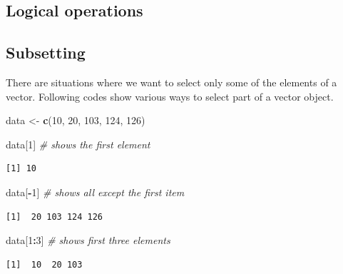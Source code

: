 \documentclass[
]{book}
\newenvironment{Shaded}{\begin{snugshade}}{\end{snugshade}}
\newcommand{\CommentTok}[1]{\textcolor[rgb]{0.56,0.35,0.01}{\textit{#1}}}
\newcommand{\DecValTok}[1]{\textcolor[rgb]{0.00,0.00,0.81}{#1}}
\newcommand{\KeywordTok}[1]{\textcolor[rgb]{0.13,0.29,0.53}{\textbf{#1}}}
\newcommand{\NormalTok}[1]{#1}
\newcommand{\OperatorTok}[1]{\textcolor[rgb]{0.81,0.36,0.00}{\textbf{#1}}}
\newcommand{\StringTok}[1]{\textcolor[rgb]{0.31,0.60,0.02}{#1}}
\begin{document}
\hypertarget{logical-operations}{%
\subsection{Logical operations}\label{logical-operations}}

\hypertarget{subsetting}{%
\subsection{Subsetting}\label{subsetting}}

There are situations where we want to select only some of the elements of a vector. Following codes show various ways to select part of a vector object.

\begin{Shaded}
\begin{Highlighting}[]
\NormalTok{data <-}\StringTok{ }\KeywordTok{c}\NormalTok{(}\DecValTok{10}\NormalTok{, }\DecValTok{20}\NormalTok{, }\DecValTok{103}\NormalTok{, }\DecValTok{124}\NormalTok{, }\DecValTok{126}\NormalTok{)}

\NormalTok{data[}\DecValTok{1}\NormalTok{] }\CommentTok{# shows the first element }
\end{Highlighting}
\end{Shaded}

\begin{verbatim}
[1] 10
\end{verbatim}

\begin{Shaded}
\begin{Highlighting}[]
\NormalTok{data[}\OperatorTok{-}\DecValTok{1}\NormalTok{] }\CommentTok{# shows all except the first item}
\end{Highlighting}
\end{Shaded}

\begin{verbatim}
[1]  20 103 124 126
\end{verbatim}

\begin{Shaded}
\begin{Highlighting}[]
\NormalTok{data[}\DecValTok{1}\OperatorTok{:}\DecValTok{3}\NormalTok{] }\CommentTok{# shows first three elements}
\end{Highlighting}
\end{Shaded}

\begin{verbatim}
[1]  10  20 103
\end{verbatim}
\end{document}
